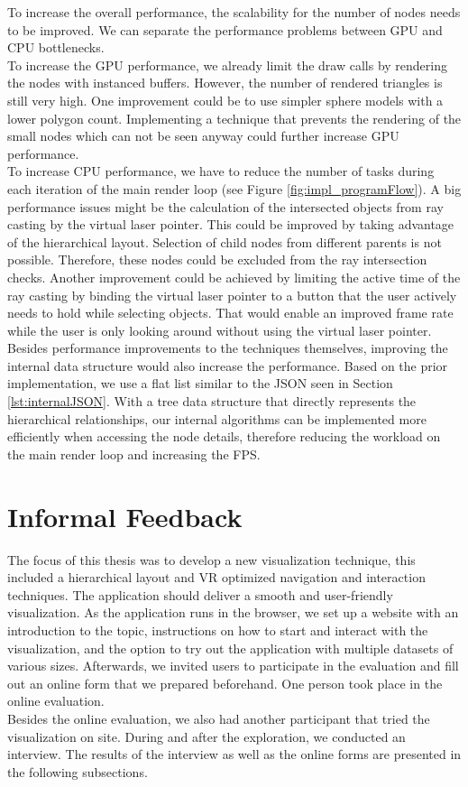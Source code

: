 To increase the overall performance, the scalability for the number of nodes needs to be improved. We can separate the performance problems between GPU and CPU bottlenecks.
\\
To increase the GPU performance, we already limit the draw calls by rendering the nodes with instanced buffers.
However, the number of rendered triangles is still very high. 
One improvement could be to use simpler sphere models with a lower polygon count. Implementing a technique that prevents the rendering of the small nodes which can not be seen anyway could further increase GPU performance.
\\
To increase CPU performance, we have to reduce the number of tasks during each iteration of the main render loop (see Figure \ref{fig:impl_programFlow}).
A big performance issues might be the calculation of the intersected objects from ray casting by the virtual laser pointer. This could be improved by taking advantage of the hierarchical layout.
Selection of child nodes from different parents is not possible. Therefore, these nodes could be excluded from the ray intersection checks. 
Another improvement could be achieved by limiting the active time of the ray casting by binding the virtual laser pointer to a button that the user actively needs to hold while selecting objects. 
That would enable an improved frame rate while the user is only looking around without using the virtual laser pointer.
\\
Besides performance improvements to the techniques themselves, improving the internal data structure would also increase the performance. Based on the prior implementation, we use a flat list similar to the JSON seen in Section \ref{lst:internalJSON}. With a tree data structure that directly represents the hierarchical relationships, our internal algorithms can be implemented more efficiently when accessing the node details, therefore reducing the workload on the main render loop and increasing the FPS.

\section{Informal Feedback}
\label{sec:informalFeedback}

The focus of this thesis was to develop a new visualization technique, this included a hierarchical layout and VR optimized navigation and interaction techniques.
The application should deliver a smooth and user-friendly visualization.
As the application runs in the browser, we set up a website \cite{thesisWebsite} with an introduction to the topic, instructions on how to start and interact with the visualization, and the option to try out the application with multiple datasets of various sizes. Afterwards, we invited users to participate in the evaluation and fill out an online form that we prepared beforehand. One person took place in the online evaluation. 
\\
Besides the online evaluation, we also had another participant that tried the visualization on site. During and after the exploration, we conducted an interview.
The results of the interview as well as the online forms are presented in the following subsections.


